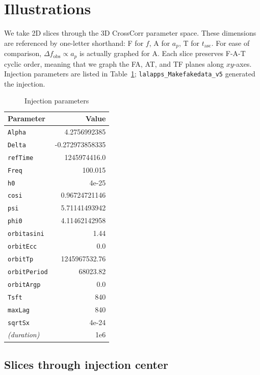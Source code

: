 \documentclass{article}
\begin{document}
\section{Illustrations}

We take 2D slices through the 3D CrossCorr parameter space.
These dimensions are referenced by one-letter shorthand: F for $f$, A for $a_p$, T for $t_\mathrm{asc}$.
For ease of comparison, $\Delta f_\mathrm{obs} \propto a_p$ is actually graphed for A.
Each slice preserves F-A-T cyclic order, meaning that we graph the FA, AT, and TF planes along $xy$-axes.
Injection parameters are listed in Table~\ref{injection_table}; \texttt{lalapps\_Makefakedata\_v5} generated the injection.


\begin{center}
\begin{table}
\begin{tabular}{lr}
\textbf{Parameter} & \textbf{Value}\\
\hline
\texttt{Alpha} & 4.2756992385\\
\texttt{Delta} & -0.272973858335\\
\texttt{refTime} & 1245974416.0\\
\texttt{Freq} & 100.015\\
\texttt{h0} & 4e-25\\
\texttt{cosi} & 0.96724721146\\
\texttt{psi} & 5.71141493942\\
\texttt{phi0} & 4.11462142958\\
\texttt{orbitasini} & 1.44\\
\texttt{orbitEcc} & 0.0\\
\texttt{orbitTp} & 1245967532.76\\
\texttt{orbitPeriod} & 68023.82\\
\texttt{orbitArgp} & 0.0\\
\hline
\texttt{Tsft} & 840\\
\texttt{maxLag} & 840\\
\texttt{sqrtSx} & 4e-24\\
\hline
\textit{(duration)} & 1e6
\end{tabular}
\label{injection_table}
\caption{Injection parameters}
\end{table}
\end{center}



\subsection{Slices through injection center}
\end{document}
